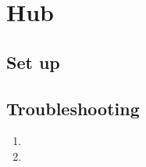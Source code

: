   \section{Hub}
  \subsection{Set up}
    \begin{enumerate}
      \item

      \item

      \item
    \end{center}


    \end{enumerate}

  \subsection{Troubleshooting}

  \begin{enumerate}
    \item
    \item
  \end{enumerate}
